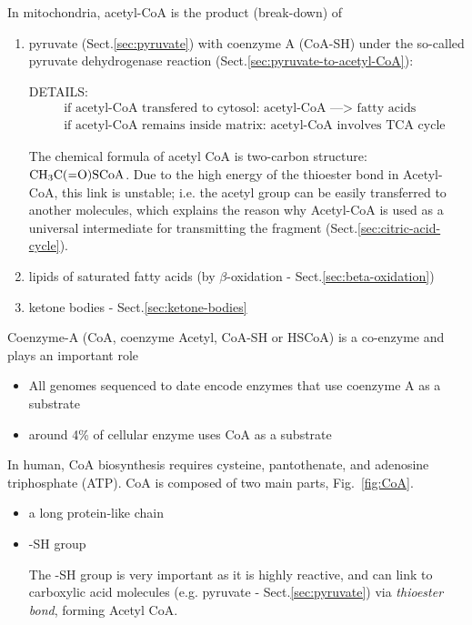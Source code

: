 In mitochondria, acetyl-CoA is the product (break-down) of
\begin{enumerate}

  \item pyruvate (Sect.\ref{sec:pyruvate}) with coenzyme A (CoA-SH) under the
  so-called pyruvate dehydrogenase reaction
  (Sect.\ref{sec:pyruvate-to-acetyl-CoA}):

DETAILS:
\begin{equation}
\begin{split}
&\text{ if acetyl-CoA transfered to cytosol: acetyl-CoA ---> fatty acids} \\
&\text{ if acetyl-CoA remains inside matrix: acetyl-CoA involves TCA cycle}
\end{split}
\end{equation}

The chemical formula of acetyl CoA is two-carbon structure:
$\ce{CH3C(=O)SCoA}$. Due to the high energy of the thioester bond in
Acetyl-CoA, this link is unstable; i.e. the acetyl group can be easily
transferred to another molecules, which explains the reason why Acetyl-CoA is
used as a universal intermediate for transmitting the  fragment
(Sect.\ref{sec:citric-acid-cycle}).


  \item lipids of saturated fatty acids (by $\beta$-oxidation -
  Sect.\ref{sec:beta-oxidation})

  \item ketone bodies - Sect.\ref{sec:ketone-bodies}
\end{enumerate}


\begin{mdframed}
Coenzyme-A (CoA, coenzyme Acetyl, CoA-SH or HSCoA) is a co-enzyme and plays an
important role
\begin{itemize}
  \item   All genomes sequenced to date encode enzymes that use coenzyme A as a
  substrate
  \item around 4\% of cellular enzyme uses CoA as a substrate
\end{itemize}

In human, CoA biosynthesis requires cysteine, pantothenate, and adenosine
triphosphate (ATP). CoA is composed of two main parts,
Fig.~\ref{fig:CoA}.
\begin{itemize}
  \item a long protein-like chain
  \item -SH group

The -SH group is very important as it is highly reactive, and can link to
carboxylic acid molecules (e.g. pyruvate - Sect.\ref{sec:pyruvate}) via {\it
thioester bond}, forming Acetyl CoA.

\end{itemize}

\end{mdframed}

